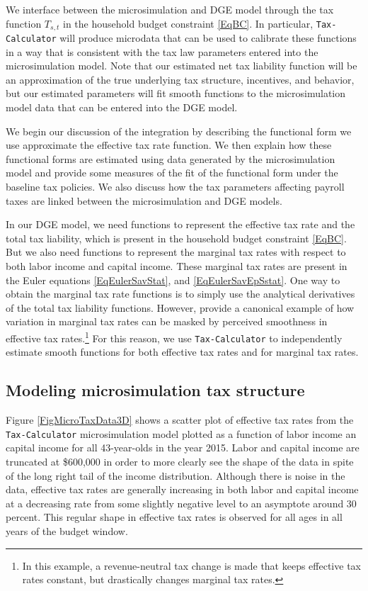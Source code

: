 \documentclass[letterpaper,12pt]{article}
\theoremstyle{definition}
\begin{document}
\begin{spacing}{1.5}
  We interface between the microsimulation and DGE model through the tax function $T_{s,t}$ in the household budget constraint \eqref{EqBC}. In particular, \texttt{Tax-Calculator} will produce microdata that can be used to calibrate these functions in a way that is consistent with the tax law parameters entered into the microsimulation model. Note that our estimated net tax liability function will be an approximation of the true underlying tax structure, incentives, and behavior, but our estimated parameters will fit smooth functions to the microsimulation model data that can be entered into the DGE model.

  We begin our discussion of the integration by describing the functional form we use approximate the effective tax rate function. We then explain how these functional forms are estimated using data generated by the microsimulation model and provide some measures of the fit of the functional form under the baseline tax policies. We also discuss how the tax parameters affecting payroll taxes are linked between the microsimulation and DGE models.

  In our DGE model, we need functions to represent the effective tax rate and the total tax liability, which is present in the household budget constraint \eqref{EqBC}. But we also need functions to represent the marginal tax rates with respect to both labor income and capital income. These marginal tax rates are present in the Euler equations \eqref{EqEulerSavStat}, and \eqref{EqEulerSavEpSstat}. One way to obtain the marginal tax rate functions is to simply use the analytical derivatives of the total tax liability functions. However, \citet[p.3]{BrillViard:2011} provide a canonical example of how variation in marginal tax rates can be masked by perceived smoothness in effective tax rates.\footnote{In this example, a revenue-neutral tax change is made that keeps effective tax rates constant, but drastically changes marginal tax rates.} For this reason, we use \texttt{Tax-Calculator} to independently estimate smooth functions for both effective tax rates and for marginal tax rates.


  \subsection{Modeling microsimulation tax structure}\label{SecIntegrMicrosim}

    Figure \ref{FigMicroTaxData3D} shows a scatter plot of effective tax rates from the \texttt{Tax-Calculator} microsimulation model plotted as a function of labor income an capital income for all 43-year-olds in the year 2015. Labor and capital income are truncated at \$600,000 in order to more clearly see the shape of the data in spite of the long right tail of the income distribution. Although there is noise in the data, effective tax rates are generally increasing in both labor and capital income at a decreasing rate from some slightly negative level to an asymptote around 30 percent. This regular shape in effective tax rates is observed for all ages in all years of the budget window.


\end{spacing}
\end{document}
